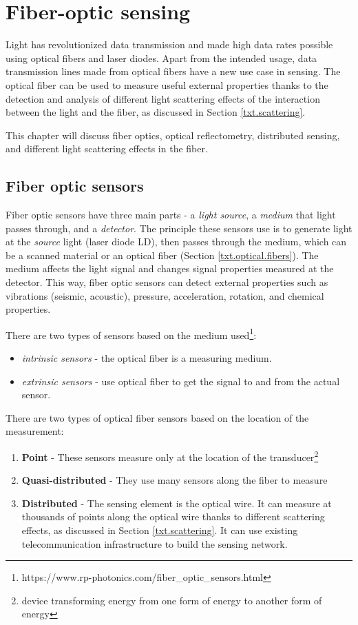 \chapter{Fiber-optic sensing}\label{txt.sensing}

Light has revolutionized data transmission and made high data rates possible using optical fibers and laser diodes. Apart from the intended usage, data transmission lines made from optical fibers have a new use case in sensing. The optical fiber can be used to measure useful external properties thanks to the detection and analysis of different light scattering effects of the interaction between the light and the fiber, as discussed in Section \ref{txt.scattering}.

This chapter will discuss fiber optics, optical reflectometry, distributed sensing, and different light scattering effects in the fiber.




\section{Fiber optic sensors}

Fiber optic sensors have three main parts - a \textit{light source}, a \textit{medium} that light passes through, and a \textit{detector}. The principle these sensors use is to generate light at the \textit{source} light (laser diode LD), then passes through the medium, which can be a scanned material or an optical fiber (Section \ref{txt.optical.fibers}). The medium affects the light signal and changes signal properties measured at the detector. This way, fiber optic sensors can detect external properties such as vibrations (seismic, acoustic), pressure, acceleration, rotation, and chemical properties.

There are two types of sensors based on the medium used\footnote{https://www.rp-photonics.com/fiber\_optic\_sensors.html}:
\begin{itemize}
    \item \textit{intrinsic sensors} - the optical fiber is a measuring medium.
    \item \textit{extrinsic sensors} - use optical fiber to get the signal to and from the actual sensor.
\end{itemize}

There are two types of optical fiber sensors based on the location of the measurement:
\begin{enumerate}
    \item \textbf{Point} - These sensors measure only at the location of the transducer\footnote{device transforming energy from one form of energy to another form of energy}
    \item \textbf{Quasi-distributed} - They use many sensors along the fiber to measure 
    \item \textbf{Distributed} - The sensing element is the optical wire. It can measure at thousands of points along the optical wire thanks to different scattering effects, as discussed in Section \ref{txt.scattering}. It can use existing telecommunication infrastructure to build the sensing network.
\end{enumerate}

